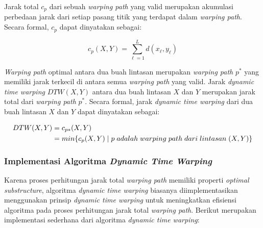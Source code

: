 \documentclass[a4paper,twoside]{article}
\begin{document}
\newpage

Jarak total $c_p$ dari sebuah \textit{warping path} yang valid merupakan akumulasi perbedaan jarak dari setiap pasang titik yang terdapat dalam \textit{warping path}. Secara formal, $c_p$ dapat dinyatakan sebagai:

\begin{equation}
    c_p(X, Y) = \sum_{\ell = 1}^{L} d(x_\ell, y_\ell)
    \label{bab2:warping-path-length}
\end{equation}

\textit{Warping path} optimal antara dua buah lintasan merupakan \textit{warping path} $p^*$ yang memiliki jarak terkecil di antara semua \textit{warping path} yang valid. Jarak \textit{dynamic time warping} $DTW(X, Y)$ antara dua buah lintasan $X$ dan $Y$ merupakan jarak total dari \textit{warping path} $p^*$. Secara formal, jarak \textit{dynamic time warping} dari dua buah lintasan $X$ dan $Y$ dapat dinyatakan sebagai:

\vspace{-10pt}

\begin{align*}
    DTW(X, Y) & = c\textsubscript{$p*$}(X, Y) \\
    & = min\{c_p(X, Y)\;|\;p\;adalah\;warping\;path\;dari\;lintasan\;(X, Y)\}
\end{align*}

\subsubsection{Implementasi Algoritma \textit{Dynamic Time Warping}}

Karena proses perhitungan jarak total \textit{warping path} memiliki properti \textit{optimal substructure}, algoritma \textit{dynamic time warping} biasanya diimplementasikan menggunakan prinsip \textit{dynamic time warping} untuk meningkatkan efisiensi algoritma pada proses perhitungan jarak total \textit{warping path}. Berikut merupakan implementasi sederhana dari algoritma \textit{dynamic time warping}:
\end{document}
